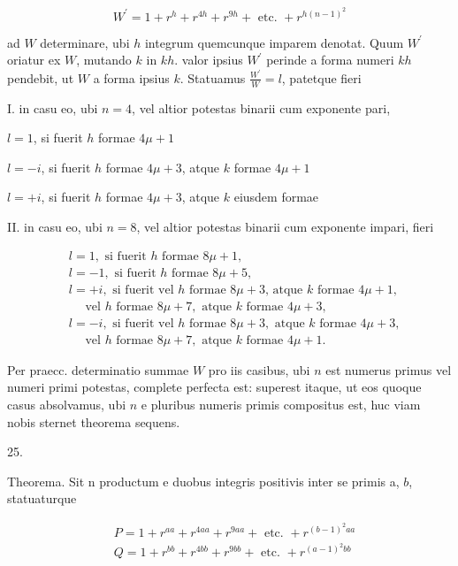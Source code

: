 \documentclass[10pt]{article}
\begin{document}
\[
W^{\prime}=1+r^{h}+r^{4 h}+r^{9 h}+\text { etc. }+r^{h(n-1)^{2}}
\]

ad \(W\) determinare, ubi \(h\) integrum quemcunque imparem denotat. Quum \(W^{\prime}\) oriatur ex \(W\), mutando \(k\) in \(k h\). valor ipsius \(W^{\prime}\) perinde a forma numeri \(k h\) pendebit, ut \(W\) a forma ipsius \(k\). Statuamus \(\frac{W^{\prime}}{W}=l\), patetque fieri

I. in casu eo, ubi \(n=4\), vel altior potestas binarii cum exponente pari,

\(l=1\), si fuerit \(h\) formae \(4 \mu+1\)

\(l=-i\), si fuerit \(h\) formae \(4 \mu+3\), atque \(k\) formae \(4 \mu+1\)

\(l=+i\), si fuerit \(h\) formae \(4 \mu+3\), atque \(k\) eiusdem formae

II. in casu eo, ubi \(n=8\), vel altior potestas binarii cum exponente impari, fieri

\[
\begin{aligned}
& l=1, \text { si fuerit } h \text { formae } 8 \mu+1, \\
& l=-1, \text { si fuerit } h \text { formae } 8 \mu+5, \\
& l=+i, \text { si fuerit vel } h \text { formae } 8 \mu+3 \text {, atque } k \text { formae } 4 \mu+1, \\
& \quad \text { vel } h \text { formae } 8 \mu+7, \text { atque } k \text { formae } 4 \mu+3, \\
& l=-i, \text { si fuerit vel } h \text { formae } 8 \mu+3, \text { atque } k \text { formae } 4 \mu+3, \\
& \quad \text { vel } h \text { formae } 8 \mu+7, \text { atque } k \text { formae } 4 \mu+1 .
\end{aligned}
\]

Per praecc. determinatio summae \(W\) pro iis casibus, ubi \(n\) est numerus primus vel numeri primi potestas, complete perfecta est: superest itaque, ut eos quoque casus absolvamus, ubi \(n\) e pluribus numeris primis compositus est, huc viam nobis sternet theorema sequens.

25.

Theorema. Sit n productum e duobus integris positivis inter se primis a, \(b\), statuaturque

\[
\begin{aligned}
& P=1+r^{a a}+r^{4 a a}+r^{9 a a}+\text { etc. }+r^{(b-1)^{2} a a} \\
& Q=1+r^{b b}+r^{4 b b}+r^{9 b b}+\text { etc. }+r^{(a-1)^{2} b b}
\end{aligned}
\]
\end{document}
